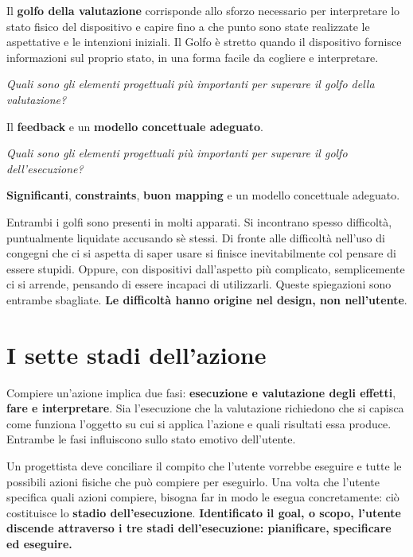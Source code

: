 Il \textbf{golfo della valutazione} corrisponde allo sforzo necessario per interpretare lo stato fisico del dispositivo e capire fino a che punto sono state realizzate le aspettative e le intenzioni iniziali. Il Golfo è stretto quando il dispositivo fornisce informazioni sul proprio stato, in una forma facile da cogliere e interpretare.

\pagebreak

\begin{flushleft}
	\textit{
		Quali sono gli elementi progettuali più importanti per superare il golfo della valutazione?}
\end{flushleft}

Il \textbf{feedback} e un \textbf{modello concettuale adeguato}.

\begin{flushleft}
	\textit{Quali sono gli elementi progettuali più importanti per superare il golfo dell'esecuzione?}
\end{flushleft}
\textbf{Significanti}, \textbf{constraints}, \textbf{buon mapping} e un modello concettuale adeguato.

Entrambi i golfi sono presenti in molti apparati. Si incontrano spesso difficoltà, puntualmente liquidate accusando sè stessi. Di fronte alle difficoltà nell'uso di congegni che ci si aspetta di saper usare si finisce inevitabilmente col pensare di essere stupidi. Oppure, con dispositivi dall'aspetto più complicato, semplicemente ci si arrende, pensando di essere incapaci di utilizzarli. Queste spiegazioni sono entrambe sbagliate. \textbf{Le difficoltà hanno origine nel design, non nell'utente}.

\section{I sette stadi dell'azione}
Compiere un'azione implica due fasi: \textbf{esecuzione e valutazione degli effetti}, \textbf{fare e interpretare}. Sia l'esecuzione che la valutazione richiedono che si capisca come funziona l'oggetto su cui si applica l'azione e quali risultati essa produce. Entrambe le fasi influiscono sullo stato emotivo dell'utente.

Un progettista deve conciliare il compito che l'utente vorrebbe eseguire e tutte le possibili azioni fisiche che può compiere per eseguirlo. Una volta che l'utente specifica quali azioni compiere, bisogna far in modo le esegua concretamente: ciò costituisce lo \textbf{stadio dell'esecuzione}. \textbf{Identificato il goal, o scopo, l'utente discende attraverso i tre stadi dell'esecuzione: pianificare, specificare ed eseguire.}

